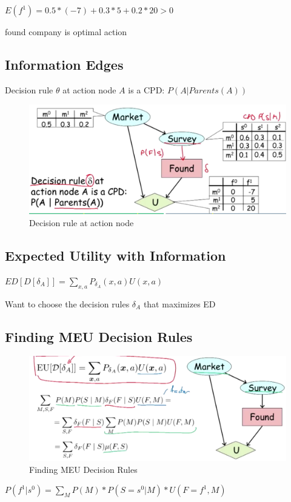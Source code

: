 \documentclass{book}
\begin{document}
$E(f^1) = 0.5*(-7) + 0.3 *5+0.2*20 > 0$

found company is optimal action

\subsection{Information Edges}

Decision rule $\theta$ at action node $A$ is a CPD: $P(A|Parents(A))$

\begin{figure}[h]
\centering
\includegraphics[width=0.7\linewidth]{./figures/decisionedge}
\caption{Decision rule at action node}
\label{fig:decisionedge}
\end{figure}

\subsection{Expected Utility with Information}

$ED[D[\delta_A]] = \sum_{x,a}P_{\delta_A}(x,a) U(x,a)$

Want to choose the decision rules $\delta_A$ that maximizes ED

\subsection{Finding MEU Decision Rules}

\begin{figure}[h]
\centering
\includegraphics[width=0.7\linewidth]{./figures/decisionedge1}
\caption{Finding MEU Decision Rules}
\label{fig:decisionedge1}
\end{figure}

$P(f^1|s^0) = \sum_{M} P(M)* P(S=s^0|M) * U(F=f^1,M)$
\end{document}
